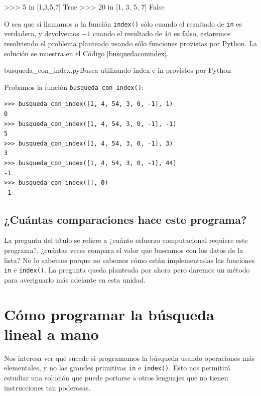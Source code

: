 \begin{codigo-python-sn}
>>> 5 in [1,3,5,7]
True
>>> 20 in [1, 3, 5, 7]
False
\end{codigo-python-sn}

O sea que si llamamos a la función \lstinline+index()+ sólo cuando el
resultado de \lstinline+in+ es verdadero, y devolvemos $-1$ cuando el
resultado de \lstinline+in+ es falso, estaremos resolviendo el problema
planteado usando sólo funciones provistas por Python. La solución se
muestra en el Código \ref{busquedaconindex}. \\

\begin{codigo}{busqueda\_con\_index.py}{Busca utilizando index e in provistos por Python}
\label{busquedaconindex}

\end{codigo}

Probamos la función \verb+busqueda_con_index()+:
\begin{verbatim}
>>> busqueda_con_index([1, 4, 54, 3, 0, -1], 1)
0
>>> busqueda_con_index([1, 4, 54, 3, 0, -1], -1)
5
>>> busqueda_con_index([1, 4, 54, 3, 0, -1], 3)
3
>>> busqueda_con_index([1, 4, 54, 3, 0, -1], 44)
-1
>>> busqueda_con_index([], 0)
-1
\end{verbatim}

\subsection*{¿Cuántas comparaciones hace este programa?}

La pregunta del título se refiere a ¿cuánto esfuerzo computacional requiere
este programa?, ¿cuántas veces compara el valor que buscamos con los datos de
la lista? No lo sabemos porque no sabemos cómo están implementadas las
funciones \lstinline+in+ e \lstinline+index()+. La pregunta queda planteada
por ahora pero daremos un método para averiguarlo más adelante en esta unidad.


\section{Cómo programar la búsqueda lineal a mano}

Nos interesa ver qué sucede si programamos la búsqueda usando operaciones más
elementales, y no las grandes primitivas \lstinline+in+ e \lstinline+index()+.
Esto nos permitirá estudiar una solución que puede portarse a otros lenguajes
que no tienen instrucciones tan poderosas.


